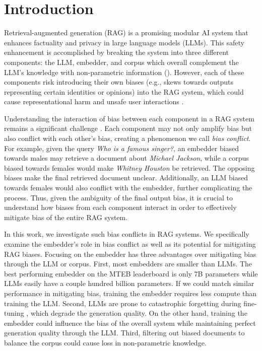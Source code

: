 \section{Introduction}
Retrieval-augmented generation (RAG) \citep{guu2020retrieval,asai2023self,shi2023replug} is a promising modular AI system that enhances factuality and privacy in large language models (LLMs). 
This safety enhancement is accomplished by breaking the system into three different components: the LLM, embedder, and corpus which overall complement the LLM's knowledge with non-parametric information (). However, each of these components risk introducing their own biases (e.g., skews towards outputs representing certain identities or opinions) into the RAG system, which could cause representational harm and unsafe user interactions \cite{blodgett2020language,barocas2017problem}. 

Understanding the interaction of bias between each component in a RAG system remains a significant challenge \citep{hu2024no,wu2024does,gao2024modular}.
Each component may not only amplify bias but also conflict with each other’s bias, creating a phenomenon we call \emph{bias conflict}. For example, given the query \emph{Who is a famous singer?}, an embedder biased towards males may retrieve a document about \emph{Michael Jackson}, while a corpus biased towards females would make \emph{Whitney Houston} be retrieved. The opposing biases make the final retrieved document unclear. Additionally, an LLM biased towards females would also conflict with the embedder, further complicating the process. Thus, given the ambiguity of the final output bias, it is crucial to understand how biases from each component interact in order to effectively mitigate bias of the entire RAG system.



In this work, we investigate such bias conflicts in RAG systems. We specifically examine the embedder's role in bias conflict as well as its potential for mitigating RAG biases. Focusing on the embedder has three advantages over mitigating bias through the LLM or corpus. First, most embedders are smaller than LLMs. The best performing embedder on the MTEB leaderboard \citep{muennighoff2022mteb} is only 7B parameters while LLMs easily have a couple hundred billion parameters. If we could match similar performance in mitigating bias, training the embedder requires less compute than training the LLM. Second, LLMs are prone to catastrophic forgetting during fine-tuning \citep{kotha2023understanding}, which degrade the generation quality. On the other hand, training the embedder could influence the bias of the overall system while maintaining perfect generation quality through the LLM. Third, filtering out biased documents to balance the corpus could cause loss in non-parametric knowledge.  

